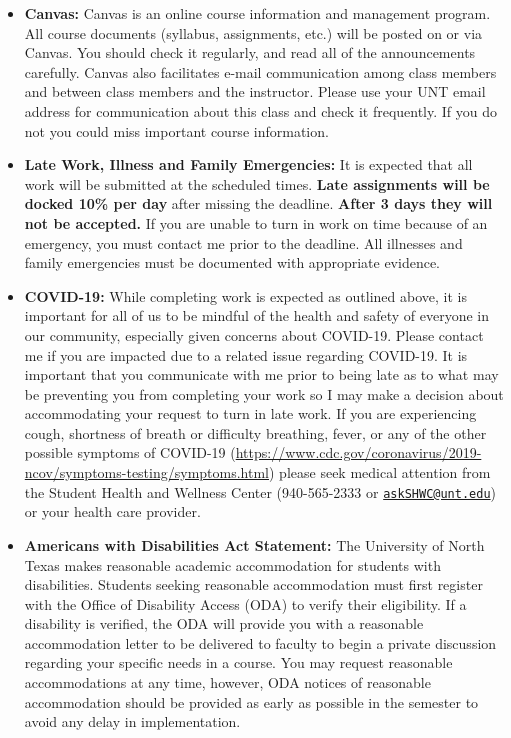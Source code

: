 \documentclass[12pt,]{article}
\begin{document}
\begin{itemize}
\item
  \textbf{Canvas:} Canvas is an online course information and management
  program. All course documents (syllabus, assignments, etc.) will be
  posted on or via Canvas. You should check it regularly, and read all
  of the announcements carefully. Canvas also facilitates e-mail
  communication among class members and between class members and the
  instructor. Please use your UNT email address for communication about
  this class and check it frequently. If you do not you could miss
  important course information.
\item
  \textbf{Late Work, Illness and Family Emergencies:} It is expected
  that all work will be submitted at the scheduled times. \textbf{Late
  assignments will be docked 10\% per day} after missing the deadline.
  \textbf{After 3 days they will not be accepted.} If you are unable to
  turn in work on time because of an emergency, you must contact me
  prior to the deadline. All illnesses and family emergencies must be
  documented with appropriate evidence.
\item
  \textbf{COVID-19:} While completing work is expected as outlined
  above, it is important for all of us to be mindful of the health and
  safety of everyone in our community, especially given concerns about
  COVID-19. Please contact me if you are impacted due to a related issue
  regarding COVID-19. It is important that you communicate with me prior
  to being late as to what may be preventing you from completing your
  work so I may make a decision about accommodating your request to turn
  in late work. If you are experiencing cough, shortness of breath or
  difficulty breathing, fever, or any of the other possible symptoms of
  COVID-19
  (\url{https://www.cdc.gov/coronavirus/2019-ncov/symptoms-testing/symptoms.html})
  please seek medical attention from the Student Health and Wellness
  Center (940-565-2333 or
  \href{mailto:askSHWC@unt.edu}{\nolinkurl{askSHWC@unt.edu}}) or your
  health care provider.
\item
  \textbf{Americans with Disabilities Act Statement:} The University of
  North Texas makes reasonable academic accommodation for students with
  disabilities. Students seeking reasonable accommodation must first
  register with the Office of Disability Access (ODA) to verify their
  eligibility. If a disability is verified, the ODA will provide you
  with a reasonable accommodation letter to be delivered to faculty to
  begin a private discussion regarding your specific needs in a course.
  You may request reasonable accommodations at any time, however, ODA
  notices of reasonable accommodation should be provided as early as
  possible in the semester to avoid any delay in implementation.
\end{itemize}
\end{document}
